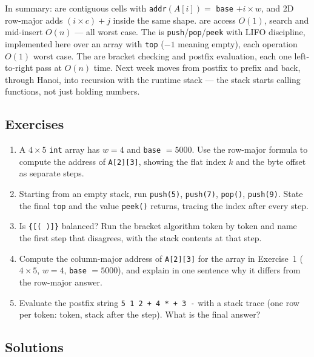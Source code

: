 \documentclass[11pt]{article}
\begin{document}
In summary:  are contiguous cells with \texttt{addr}$(A[i]) = $ \texttt{base} $+ i \times w$, and 2D row-major adds $(i \times c) + j$ inside the same shape.  are access $O(1)$, search and mid-insert $O(n)$ --- all worst case. The  is \texttt{push}/\texttt{pop}/\texttt{peek} with LIFO discipline, implemented here over an array with \texttt{top} ($-1$ meaning empty), each operation $O(1)$ worst case. The  are bracket checking and postfix evaluation, each one left-to-right pass at $O(n)$ time. Next week moves from postfix to prefix and back, through Hanoi, into recursion with the runtime stack --- the stack starts calling functions, not just holding numbers.

\subsection*{Exercises}

\begin{enumerate}
  \item A $4 \times 5$ \texttt{int} array has $w = 4$ and \texttt{base} $= 5000$. Use the row-major formula to compute the address of \texttt{A[2][3]}, showing the flat index $k$ and the byte offset as separate steps.
  \item Starting from an empty stack, run \texttt{push(5)}, \texttt{push(7)}, \texttt{pop()}, \texttt{push(9)}. State the final \texttt{top} and the value \texttt{peek()} returns, tracing the index after every step.
  \item Is \texttt{\{[( )]\}} balanced? Run the bracket algorithm token by token and name the first step that disagrees, with the stack contents at that step.
  \item Compute the column-major address of \texttt{A[2][3]} for the array in Exercise~1 ($4 \times 5$, $w = 4$, \texttt{base} $= 5000$), and explain in one sentence why it differs from the row-major answer.
  \item Evaluate the postfix string \texttt{5 1 2 + 4 * + 3 -} with a stack trace (one row per token: token, stack after the step). What is the final answer?
\end{enumerate}

\subsection*{Solutions}
\end{document}
